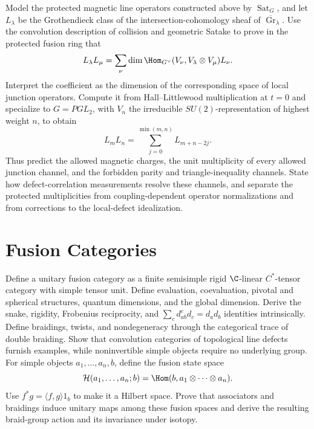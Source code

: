 \begin{exercise}
Model the protected magnetic line operators constructed above by
$\operatorname{Sat}_G$, and let $L_\lambda$ be the Grothendieck class of the
intersection-cohomology sheaf of
$\overline{\operatorname{Gr}}_\lambda$.  Use the convolution description of
collision and geometric Satake to prove in the protected fusion ring that
\[
 L_\lambda L_\mu=\sum_\nu
 \dim\Hom_{G^\vee}(V_\nu,V_\lambda\otimes V_\mu)L_\nu.
\]
Interpret the coefficient as the dimension of the corresponding space of
local junction operators.  Compute it from Hall--Littlewood multiplication at
$t=0$ and specialize to $G=PGL_2$, with $V_n$ the irreducible
$SU(2)$-representation of highest weight $n$, to obtain
\[
 L_mL_n=\sum_{j=0}^{\min(m,n)}L_{m+n-2j}.
\]
Thus predict the allowed magnetic charges, the unit multiplicity of every
allowed junction channel, and the forbidden parity and triangle-inequality
channels.  State how defect-correlation measurements resolve these channels,
and separate the protected multiplicities from coupling-dependent operator
normalizations and from corrections to the local-defect idealization.
\end{exercise}

\section{Fusion Categories}

\begin{exercise}
Define a unitary fusion category as a finite semisimple rigid
$\C$-linear $C^*$-tensor category with simple tensor unit.  Define evaluation,
coevaluation, pivotal and spherical structures, quantum dimensions, and the
global dimension.  Derive the snake, rigidity, Frobenius reciprocity, and
$\sum_cd_{ab}^cd_c=d_ad_b$ identities intrinsically.  Define braidings,
twists, and nondegeneracy through the categorical trace of double braiding.
Show that convolution categories of topological line defects furnish
examples, while noninvertible simple objects require no underlying group.
For simple objects $a_1,\ldots,a_n,b$, define the fusion state space
\[
 \mathcal H(a_1,\ldots,a_n;b)
 =\Hom(b,a_1\otimes\cdots\otimes a_n).
\]
Use $f^*g=\langle f,g\rangle1_b$ to make it a Hilbert space.  Prove that
associators and braidings induce unitary maps among these fusion spaces and
derive the resulting braid-group action and its invariance under isotopy.
\end{exercise}

